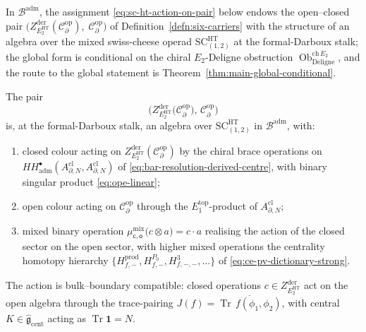 \begin{thm}
\label{thm:sc-ht-deligne-swiss-cheese}

In $\mathcal B^{\mathrm{adm}}$, the assignment
\eqref{eq:sc-ht-action-on-pair} below endows the open--closed pair
$\bigl(Z^{\mathrm{der}}_{E_2^{\mathrm{HT}}}(\mathcal C^{\mathrm{op}}_\partial),\;
\mathcal C^{\mathrm{op}}_\partial\bigr)$ of
Definition~\ref{defn:six-carriers} with the structure of an algebra
over the mixed swiss-cheese operad
$\mathrm{SC}^{\mathrm{HT}}_{(1,2)}$ at the formal-Darboux stalk; the
global form is conditional on the chiral $E_2$-Deligne obstruction
$\operatorname{Ob}^{\mathrm{ch}\,E_2}_{\mathrm{Deligne}}$, and the
route to the global statement is
Theorem~\ref{thm:main-global-conditional}.

The pair
\begin{equation}\label{eq:sc-ht-action-on-pair}
  \bigl(Z^{\mathrm{der}}_{E_2^{\mathrm{HT}}}\!\bigl(
    \mathcal C^{\mathrm{op}}_\partial\bigr),\,
    \mathcal C^{\mathrm{op}}_\partial\bigr)
\end{equation}
is, at the formal-Darboux stalk, an algebra over
\(\mathrm{SC}^{\mathrm{HT}}_{(1,2)}\) in \(\mathcal B^{\mathrm{adm}}\),
with:
\begin{enumerate}[label=\textup{(\roman*)}]
  \item closed colour acting on
        \(Z^{\mathrm{der}}_{E_2^{\mathrm{HT}}}(
        \mathcal C^{\mathrm{op}}_\partial)\) by the chiral brace
        operations on
        \(HH^\bullet_{\mathrm{adm}}(A^{\mathrm{cl}}_{\partial,N},
        A^{\mathrm{cl}}_{\partial,N})\) of
        \eqref{eq:bar-resolution-derived-centre}, with binary singular
        product \eqref{eq:ope-linear};
  \item open colour acting on \(\mathcal C^{\mathrm{op}}_\partial\)
        through the \(E_1^{\mathrm{top}}\)-product of
        \(A^{\mathrm{cl}}_{\partial,N}\);
  \item mixed binary operation
        \(\mu^{\mathrm{mix}}_{\mathsf c,\mathsf o}\bigl(c\otimes a\bigr)
        =c\cdot a\) realising the action of the closed sector on the
        open sector, with higher mixed operations the centrality
        homotopy hierarchy
        \(\{H^{\mathrm{prod}}_{f,-},H^{P_0}_{f,-},H^3_{f,-,-},\ldots\}\)
        of \eqref{eq:ce-pv-dictionary-strong}.
\end{enumerate}
The action is bulk--boundary compatible: closed
operations \(c\in Z^{\mathrm{der}}_{E_2^{\mathrm{HT}}}\) act on the open
algebra through the trace-pairing
\(J(f)=\overline{\operatorname{Tr}\,f(\phi_1,\phi_2)}\), with central
\(K\in\widehat{\mathfrak g}_{\mathrm{cent}}\) acting as
\(\operatorname{Tr}\mathbf 1=N\).


\end{thm}
